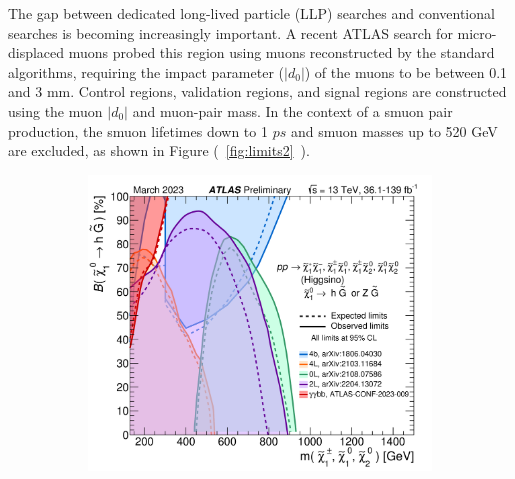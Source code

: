 \documentclass{moriond}
\begin{document}
The gap between dedicated long-lived particle (LLP) searches and conventional
searches is becoming increasingly important. A recent ATLAS search for
micro-displaced muons probed this region using muons reconstructed by the
standard algorithms, requiring the impact parameter ($|d_{0}|$) of the muons to
be between 0.1 and 3 mm. Control regions, validation regions, and signal
regions are constructed using the muon $|d_{0}|$ and muon-pair mass. In the
context of a smuon pair production, the smuon lifetimes down to 1 $ps$ and
smuon masses up to 520 GeV are excluded, as shown in Figure
(~\ref{fig:limits2}~).\\   

\begin{figure}[htp]
     \centering
     \begin{subfigure}[b]{0.32\textwidth}
         \centering
         \includegraphics[width=\textwidth]{bbyy}
         \caption{}
         \label{fig:bbyy}
     \end{subfigure}
     \begin{subfigure}[b]{0.32\textwidth}
         \centering

\end{subfigure}
\end{figure}
\end{document}
